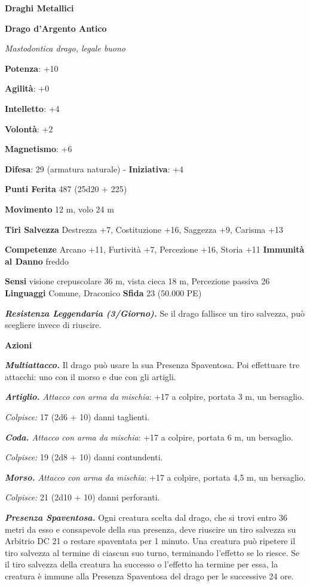 \begin{multicols}{2}
\textbf{Draghi Metallici}

\textbf{Drago d'Argento Antico}

\emph{Mastodontica drago, legale buono}

\textbf{Potenza}: +10

\textbf{Agilità}: +0

\textbf{Intelletto}: +4

\textbf{Volontà}: +2

\textbf{Magnetismo}: +6

\textbf{Difesa}: 29 (armatura naturale) - \textbf{Iniziativa}: +4

\textbf{Punti Ferita} 487 (25d20 + 225) 

\textbf{Movimento} 12 m, volo 24 m

\textbf{Tiri Salvezza} Destrezza +7, Costituzione +16, Saggezza +9,
Carisma +13

\textbf{Competenze} Arcano +11, Furtività +7, Percezione +16, Storia +11
\textbf{Immunità al Danno} freddo

\textbf{Sensi} visione crepuscolare 36 m, vista cieca 18 m, Percezione passiva
26 \textbf{Linguaggi} Comune, Draconico \textbf{Sfida} 23 (50.000 PE)

\emph{\textbf{Resistenza Leggendaria (3/Giorno).}} Se il drago fallisce
un tiro salvezza, può scegliere invece di riuscire.

\textbf{Azioni}

\emph{\textbf{Multiattacco.}} Il drago può usare la sua Presenza
Spaventosa. Poi effettuare tre attacchi: uno con il morso e due con gli
artigli.

\emph{\textbf{Artiglio.} Attacco con arma da mischia}: +17 a colpire,
portata 3 m, un bersaglio.

\emph{Colpisce:} 17 (2d6 + 10) danni taglienti.

\emph{\textbf{Coda.} Attacco con arma da mischia}: +17 a colpire,
portata 6 m, un bersaglio.

\emph{Colpisce:} 19 (2d8 + 10) danni contundenti.

\emph{\textbf{Morso.} Attacco con arma da mischia}: +17 a colpire,
portata 4,5 m, un bersaglio.

\emph{Colpisce:} 21 (2d10 + 10) danni perforanti.

\emph{\textbf{Presenza Spaventosa.}} Ogni creatura scelta dal drago, che
si trovi entro 36 metri da esso e consapevole della sua presenza, deve
riuscire un tiro salvezza su Arbitrio DC 21 o restare spaventata per 1
minuto. Una creatura può ripetere il tiro salvezza al termine di ciascun
suo turno, terminando l'effetto se lo riesce. Se il tiro salvezza della
creatura ha successo o l'effetto ha termine per essa, la creatura è
immune alla Presenza Spaventosa del drago per le successive 24 ore.


\end{multicols}
